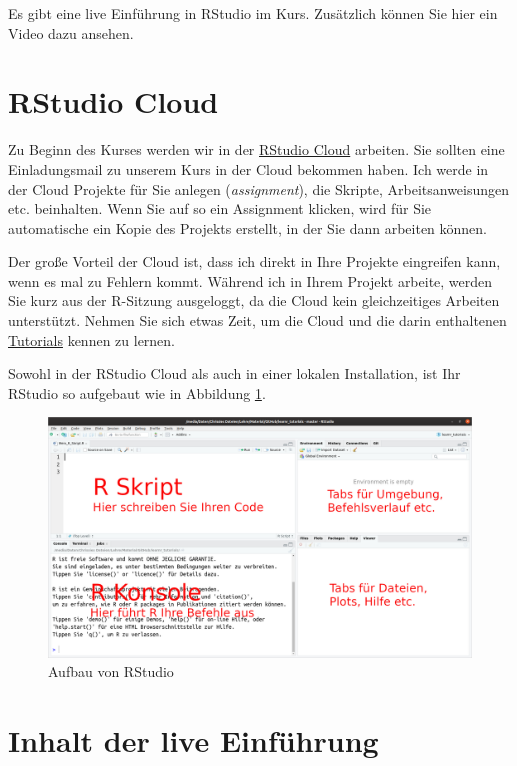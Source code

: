 \documentclass[]{book}
\begin{document}
Es gibt eine live Einführung in RStudio im Kurs. Zusätzlich können Sie hier ein Video dazu ansehen.

\hypertarget{rstudio-cloud}{%
\section{RStudio Cloud}\label{rstudio-cloud}}

Zu Beginn des Kurses werden wir in der \href{https://rstudio.cloud/}{RStudio Cloud} arbeiten. Sie sollten eine Einladungsmail zu unserem Kurs in der Cloud bekommen haben. Ich werde in der Cloud Projekte für Sie anlegen (\emph{assignment}), die Skripte, Arbeitsanweisungen etc. beinhalten. Wenn Sie auf so ein Assignment klicken, wird für Sie automatische ein Kopie des Projekts erstellt, in der Sie dann arbeiten können.

Der große Vorteil der Cloud ist, dass ich direkt in Ihre Projekte eingreifen kann, wenn es mal zu Fehlern kommt. Während ich in Ihrem Projekt arbeite, werden Sie kurz aus der R-Sitzung ausgeloggt, da die Cloud kein gleichzeitiges Arbeiten unterstützt. Nehmen Sie sich etwas Zeit, um die Cloud und die darin enthaltenen \href{https://rstudio.cloud/learn/primers}{Tutorials} kennen zu lernen.

Sowohl in der RStudio Cloud als auch in einer lokalen Installation, ist Ihr RStudio so aufgebaut wie in Abbildung \ref{fig:rstudio}.

\begin{figure}
\includegraphics[width=1\linewidth]{RStudio} \caption{Aufbau von RStudio}\label{fig:rstudio}
\end{figure}

\hypertarget{inhalt-der-live-einfuxfchrung}{%
\section{Inhalt der live Einführung}\label{inhalt-der-live-einfuxfchrung}}
\end{document}
